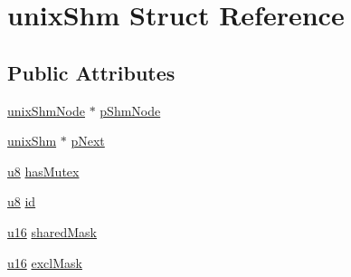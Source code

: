 \hypertarget{structunix_shm}{\section{unix\-Shm Struct Reference}
\label{structunix_shm}
}
\subsection*{Public Attributes}
\begin{DoxyCompactItemize}
\item 
\hyperlink{structunix_shm_node}{unix\-Shm\-Node} $\ast$ \hyperlink{structunix_shm_a8ab421232d29e3237262ef46775199ee}{p\-Shm\-Node}
\item 
\hyperlink{structunix_shm}{unix\-Shm} $\ast$ \hyperlink{structunix_shm_a0d5229cf734581f51cdf16dd7d5ce93a}{p\-Next}
\item 
\hyperlink{sqlite3_8c_a74a0f6424ae628af25f23f0a35f6ead3}{u8} \hyperlink{structunix_shm_a43903be262472299c5eee917ba7c523c}{has\-Mutex}
\item 
\hyperlink{sqlite3_8c_a74a0f6424ae628af25f23f0a35f6ead3}{u8} \hyperlink{structunix_shm_a88a5e7161ff31f85740dbfc0ba7ad38a}{id}
\item 
\hyperlink{sqlite3_8c_a20f2299e322dcbde37cb07b16910b843}{u16} \hyperlink{structunix_shm_a768aa62a6ea2bd91ab60a34d7654811b}{shared\-Mask}
\item 
\hyperlink{sqlite3_8c_a20f2299e322dcbde37cb07b16910b843}{u16} \hyperlink{structunix_shm_ac6f786d95952e51cab941cbfb9243c8e}{excl\-Mask}
\end{DoxyCompactItemize}


